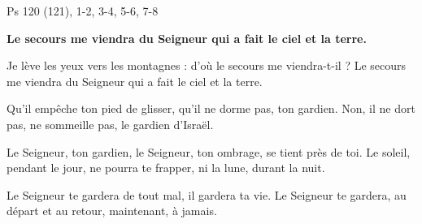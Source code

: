 Ps 120 (121), 1-2, 3-4, 5-6, 7-8

\textbf{Le secours me viendra du Seigneur
qui a fait le ciel et la terre.}

Je lève les yeux vers les montagnes :
d’où le secours me viendra-t-il ?
Le secours me viendra du Seigneur
qui a fait le ciel et la terre.


Qu’il empêche ton pied de glisser,
qu’il ne dorme pas, ton gardien.
Non, il ne dort pas, ne sommeille pas,
le gardien d’Israël.


Le Seigneur, ton gardien, le Seigneur, ton ombrage,
se tient près de toi.
Le soleil, pendant le jour, ne pourra te frapper,
ni la lune, durant la nuit.


Le Seigneur te gardera de tout mal,
il gardera ta vie.
Le Seigneur te gardera, au départ et au retour,
maintenant, à jamais.

